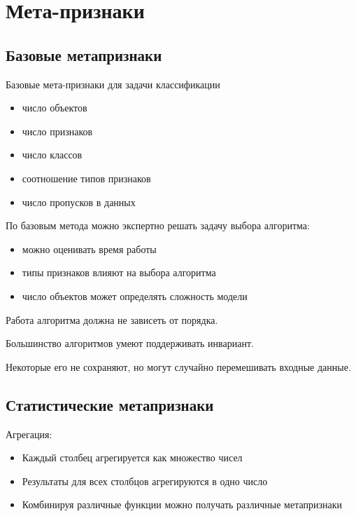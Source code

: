 \section{Мета-признаки}

\subsection*{Базовые метапризнаки}


Базовые мета-признаки для задачи классификации
\begin{itemize}
    \item число объектов
    \item число признаков
    \item число классов
    \item соотношение типов признаков
    \item число пропусков в данных
\end{itemize}

По базовым метода можно экспертно решать задачу выбора алгоритма:
\begin{itemize}
    \item можно оценивать время работы
    \item типы признаков влияют на выбора алгоритма
    \item число объектов может определять сложность модели
\end{itemize}


Работа алгоритма должна не зависеть от порядка.

Большинство алгоритмов умеют поддерживать инвариант.

Некоторые его не сохраняют, но могут случайно перемешивать
входные данные.

\subsection*{Статистические метапризнаки}

Агрегация:
\begin{itemize}
    \item Каждый столбец агрегируется как множество чисел
    \item Результаты для всех столбцов агрегируются в одно число
    \item Комбинируя различные функции можно получать различные
    метапризнаки
\end{itemize}

